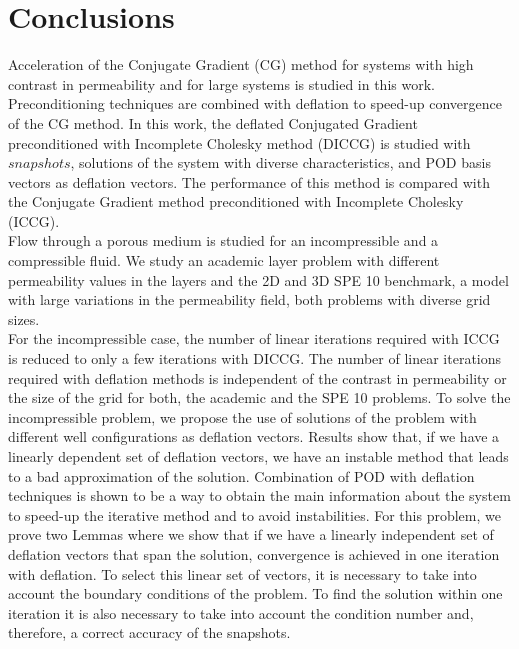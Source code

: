 \documentclass[12pt]{article}
\begin{document}
\clearpage

\newpage
\section*{Conclusions}
Acceleration of the Conjugate Gradient (CG) method for systems with high contrast in permeability and for large systems is studied in this work. Preconditioning techniques are combined with deflation to speed-up convergence of the CG method. In this work, the deflated Conjugated Gradient preconditioned with Incomplete Cholesky method (DICCG) is studied with $snapshots$, solutions of the system with diverse characteristics, and POD basis vectors as deflation vectors. The performance of this method is compared with the Conjugate Gradient method preconditioned with Incomplete Cholesky (ICCG). \\
Flow through a porous medium is studied for an incompressible and a compressible fluid. We study an academic layer problem with different permeability values in the layers and the 2D and 3D SPE 10 benchmark, a model with large variations in the permeability field, both problems with diverse grid sizes.\\
For the incompressible case, the number of linear iterations required with ICCG is reduced to only a few iterations with DICCG. The number of linear iterations required with deflation methods is independent of the contrast in permeability or the size of the grid for both, the academic and the SPE 10 problems. To solve the incompressible problem, we propose the use of solutions of the problem with different well configurations as deflation vectors. Results show that, if we have a linearly dependent set of deflation vectors, we have an instable method that leads to a bad approximation of the solution. Combination of POD with deflation techniques is shown to be a way to obtain the main information about the system to speed-up the iterative method and to avoid instabilities. For this problem, we prove two Lemmas where we show that if we have a linearly independent set of deflation vectors that span the solution, convergence is achieved in one iteration with deflation. To select this linear set of vectors, it is 
necessary to take into account the boundary conditions of the problem. To find the solution within one iteration it is also necessary to take into account the condition number and, therefore, a correct accuracy of the snapshots.  \\
\end{document}

